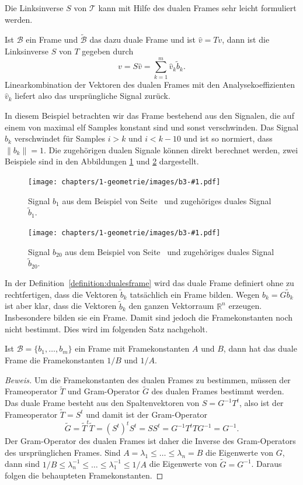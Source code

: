 Die Linksinverse $S$ von $\mathcal{T}$ kann mit Hilfe des dualen Frames
sehr leicht formuliert werden.

\begin{satz}
Ist $\mathcal{B}$ ein Frame und $\tilde{\mathcal{B}}$ das dazu duale
Frame und ist $\hat{v} = Tv$, dann ist die Linksinverse $S$ von $T$
gegeben durch
\[
v
=
S\hat{v}
=
\sum_{k=1}^m \hat{v}_k \tilde{b}_k.
\]
Linearkombination der Vektoren des dualen Frames mit den Analysekoeffizienten
$\hat{v}_k$ liefert also das ursprüngliche Signal zurück.
\end{satz}

\begin{beispiel}
\label{beispiel3}
In diesem Beispiel betrachten wir das Frame bestehend aus den
Signalen, die auf einem von maximal elf Samples konstant sind
und sonst verschwinden.
Das Signal $b_k$ verschwindet für Samples $i>k$ und $i<k-10$
und ist so normiert, dass $\|b_k\|=1$.
Die zugehörigen dualen Signale können direkt berechnet werden,
zwei Beispiele sind in den Abbildungen \ref{b3-01} und \ref{b3-05}
dargestellt.
\def\beispieldrei#1#2{
\begin{figure}
\centering
\texttt{[image: chapters/1-geometrie/images/b3-\#1.pdf]}
\caption{Signal $b_{#2}$ aus dem Beispiel von Seite~\pageref{beispiel3}
und zugehöriges duales Signal $\tilde{b}_{#2}$.
\label{b3-#1}}
\end{figure}
}
\beispieldrei{01}{1}
\beispieldrei{05}{20}
\end{beispiel}

In der Definition~\ref{definition:dualesframe} wird das duale Frame
definiert ohne zu rechtfertigen, dass die Vektoren $\tilde{b}_k$ 
tatsächlich ein Frame bilden.
Wegen $b_k=G\tilde{b}_k$ ist aber klar, dass die Vektoren $\tilde{b}_k$
den ganzen Vektorraum $\mathbb R^n$ erzeugen.
Insbesondere bilden sie ein Frame.
Damit sind jedoch die Framekonstanten noch nicht bestimmt.
Dies wird im folgenden Satz nachgeholt.

\begin{satz}
Ist $\mathcal{B}=\{b_1,\dots,b_m\}$ ein Frame mit Framekonstanten
$A$ und $B$, dann hat das duale Frame die Framekonstanten $1/B$ und $1/A$.
\end{satz}

\begin{proof}[Beweis]
Um die Framekonstanten des dualen Frames zu bestimmen,
müssen der Frameoperator $\tilde{T}$ und Gram-Operator $\tilde{G}$
des dualen Frames bestimmt werden.
Das duale Frame besteht aus den Spaltenvektoren von $S=G^{-1}T^t$,
also ist der Frameoperator $\tilde{T}=S^t$ und damit ist der Gram-Operator
\[
\tilde{G}
=
\tilde{T}^t\tilde{T}
=
(S^t)^tS^t
=
SS^t
=
G^{-1}T^tTG^{-1}
=
G^{-1}.
\]
Der Gram-Operator des dualen Frames ist daher die Inverse des
Gram-Operators des ursprünglichen Frames.
Sind $A=\lambda_1\le \dots\le \lambda_n=B$ die Eigenwerte  von $G$,
dann sind
$1/B\le \lambda_n^{-1} \le \dots \le \lambda_1^{-1}\le 1/A$ 
die Eigenwerte von $\tilde{G}=G^{-1}$.
Daraus folgen die behaupteten Framekonstanten.
\end{proof}

